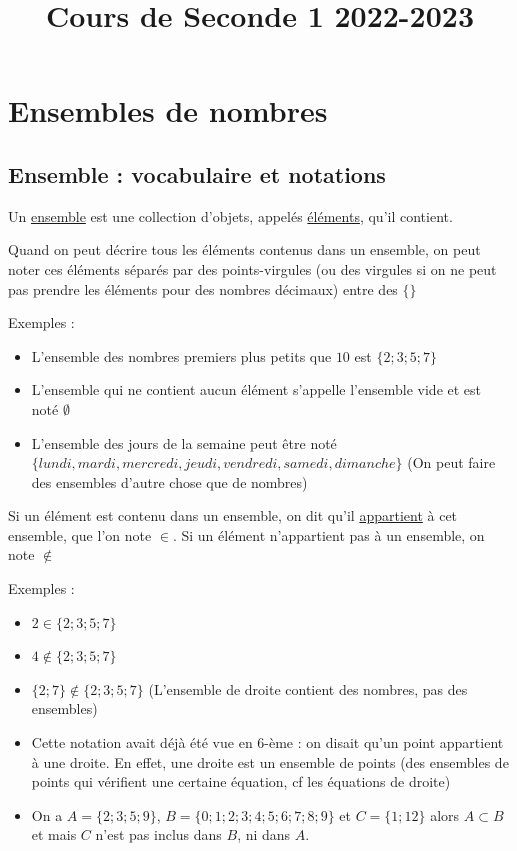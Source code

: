 \documentclass[10pt,a4paper,oneside]{book}
\title{Cours de Seconde 1 2022-2023}
\date{}
\begin{document}
\maketitle
\tableofcontents
\chapter{Ensembles de nombres}

\section{Ensemble : vocabulaire et notations}

\begin{de}
    Un \underline{ensemble} est une collection d'objets, appelés \underline{éléments}, qu'il contient. 
\end{de}

Quand on peut décrire tous les éléments contenus dans un ensemble, on peut noter ces éléments séparés par des points-virgules (ou des virgules si on ne peut pas prendre les éléments pour des nombres décimaux) entre des $\{\}$

Exemples : 
\begin{itemize}
    \item L'ensemble des nombres premiers plus petits que $10$ est $\{2;3;5;7\}$
    \item L'ensemble qui ne contient aucun élément s'appelle l'ensemble vide et est noté $\emptyset$
    \item L'ensemble des jours de la semaine peut être noté $\{lundi, mardi, mercredi, jeudi, vendredi, samedi, dimanche\}$  (On peut faire des ensembles d'autre chose que de nombres)
\end{itemize}


\begin{de}
    Si un élément est contenu dans un ensemble, on dit qu'il \underline{appartient} à cet ensemble, que l'on note $\in$.
    Si un élément n'appartient pas à un ensemble, on note $\notin$ 
\end{de}



Exemples : 
\begin{itemize}
    \item $2 \in \{2;3;5;7\}$ 
    \item $4 \notin \{2;3;5;7\}$
    \item $\{2;7\} \notin \{2;3;5;7\}$  (L'ensemble de droite contient des nombres, pas des ensembles)
    \item Cette notation avait déjà été vue en $6$-ème : on disait qu'un point appartient à une droite. En effet, une droite est un ensemble de points (des ensembles de points qui vérifient une certaine équation, cf les équations de droite)
    \item On a $A=\{2;3;5;9\}$, $B=\{0;1;2;3;4;5;6;7;8;9\}$ et $C=\{1;12\}$ alors $A\subset B$ 
  et mais $C$ n'est pas inclus dans $B$, ni dans $A$.
\end{itemize}
\end{document}
